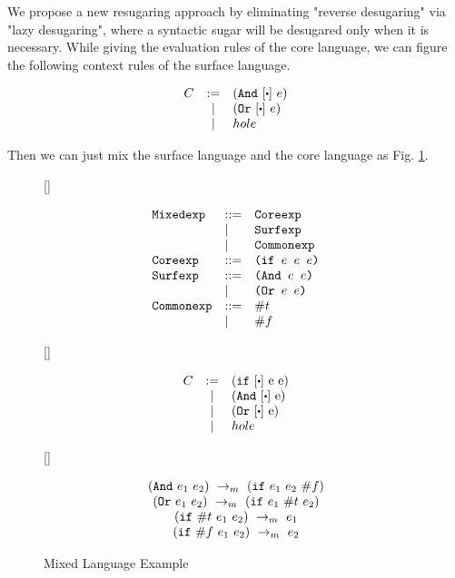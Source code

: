 We propose a new resugaring approach by eliminating "reverse desugaring" via "lazy desugaring", where a syntactic sugar will be desugared only when it is necessary. While giving the evaluation rules of the core language, we can figure the following context rules of the surface language.

\[
\begin{array}{lcl}
C &:=& (\m{And}~[\bigcdot]~e)\\
&|& (\m{Or}~[\bigcdot]~e)\\
&|&hole\\
\end{array}
\]

Then we can just mix the surface language and the core language as Fig. \ref{fig:mixexample}.

\begin{figure}[thb]
\centering
{}[\linewidth]{
\begin{flushleft}
\[
\begin{array}{lll}
\mbox{\tt Mixedexp} &::=& \mbox{\tt Coreexp}\\
&|&\mbox{\tt Surfexp}\\
&|&\mbox{\tt Commonexp}\\
\mbox{\tt Coreexp} &::=& \texttt{(if~$e$~$e$~$e$)}\\
\mbox{\tt Surfexp} &::=& \texttt{(And~$e$~$e$)}\\
&|&\texttt{(Or~$e$~$e$)}\\
\mbox{\tt Commonexp} &::=& \#t\\
&|& \#f\\
\end{array}
\]
\end{flushleft}

}
[\linewidth]{
\begin{flushleft}
\[
\begin{array}{lcl}
C &:=& (\m{if}~[\bigcdot]~$e$~$e$)\\
&|& (\m{And}~[\bigcdot]~$e$)\\
&|& (\m{Or}~[\bigcdot]~$e$)\\
&|&hole\\
\end{array}
\]
\end{flushleft}

}

[\linewidth]{
\begin{flushleft}
\[
\begin{array}{c}
(\mbox{\tt And}~e_1~e_2) ~\rightarrow_m~(\mbox{\tt if}~e_1~e_2~\#f)\\
(\mbox{\tt Or}~e_1~e_2) ~\rightarrow_m~(\mbox{\tt if}~e_1~\#t~e_2)\\
(\mbox{\tt if}~\#t~e_1~e_2) ~\rightarrow_m~e_1\\
(\mbox{\tt if}~\#f~e_1~e_2) ~\rightarrow_m~e_2 
\end{array}
\]
\end{flushleft}

}

\caption{Mixed Language Example}
\label{fig:mixexample}
\end{figure}

